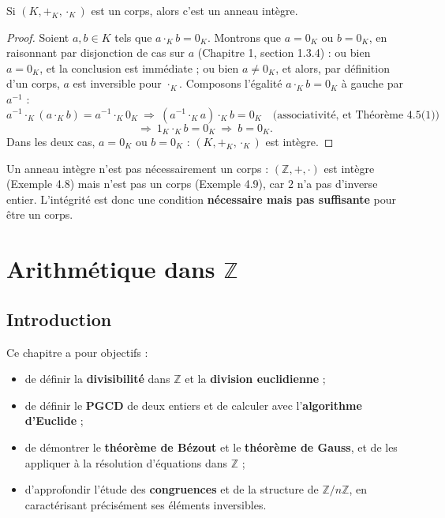 \documentclass[a4paper,12pt,openany]{book}
\begin{document}
\begin{theoreme}
Si $(K,+_K,\cdot_K)$ est un corps, alors c'est un anneau intègre.
\end{theoreme}

\begin{proof}
Soient $a,b\in K$ tels que $a\cdot_K b = 0_K$. Montrons que $a=0_K$ ou
$b=0_K$, en raisonnant par disjonction de cas sur $a$ (Chapitre 1, section
1.3.4) : ou bien $a=0_K$, et la conclusion est immédiate ; ou bien
$a\neq0_K$, et alors, par définition d'un corps, $a$ est inversible pour
$\cdot_K$. Composons l'égalité $a\cdot_Kb=0_K$ à gauche par $a^{-1}$ :
\[
a^{-1}\cdot_K(a\cdot_Kb) = a^{-1}\cdot_K 0_K
\ \Longrightarrow\
(a^{-1}\cdot_Ka)\cdot_Kb = 0_K \quad\text{(associativité, et Théorème
4.5(1))}
\]
\[
\Longrightarrow\ 1_K\cdot_Kb = 0_K
\ \Longrightarrow\ b=0_K.
\]
Dans les deux cas, $a=0_K$ ou $b=0_K$ : $(K,+_K,\cdot_K)$ est intègre.
\end{proof}

\begin{remarque}
Un anneau intègre n'est pas nécessairement un corps : $(\mathbb{Z},+,\cdot)$
est intègre (Exemple 4.8) mais n'est pas un corps (Exemple 4.9), car $2$
n'a pas d'inverse entier. L'intégrité est donc une condition
\textbf{nécessaire mais pas suffisante} pour être un corps.
\end{remarque}


\chapter{Arithmétique dans $\mathbb{Z}$}

\section{Introduction}


Ce chapitre a pour objectifs :
\begin{itemize}
  \item de définir la \textbf{divisibilité} dans $\mathbb{Z}$ et la
  \textbf{division euclidienne} ;
  \item de définir le \textbf{PGCD} de deux entiers et de calculer avec
  l'\textbf{algorithme d'Euclide} ;
  \item de démontrer le \textbf{théorème de Bézout} et le \textbf{théorème
  de Gauss}, et de les appliquer à la résolution d'équations dans
  $\mathbb{Z}$ ;
  \item d'approfondir l'étude des \textbf{congruences} et de la structure
  de $\mathbb{Z}/n\mathbb{Z}$, en caractérisant précisément ses éléments
  inversibles.
\end{itemize}
\end{document}
